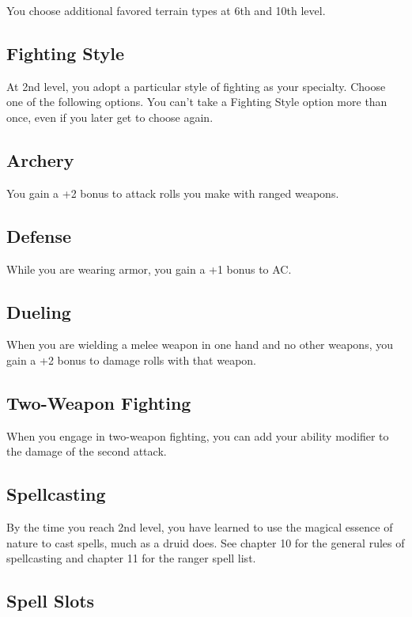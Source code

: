 You choose additional favored terrain types at 6th and 10th level.

\subsection{Fighting Style}

At 2nd level, you adopt a particular style of fighting as your specialty. Choose one of the following options. You can’t take a Fighting Style option more than once, even if you later get to choose again.

\subsection{Archery}

You gain a +2 bonus to attack rolls you make with ranged weapons.

\subsection{Defense}

While you are wearing armor, you gain a +1 bonus to AC.

\subsection{Dueling}

When you are wielding a melee weapon in one hand and no other weapons, you gain a +2 bonus to damage rolls with that weapon.

\subsection{Two-Weapon Fighting}

When you engage in two-weapon fighting, you can add your ability modifier to the damage of the second attack.

\subsection{Spellcasting}

By the time you reach 2nd level, you have learned to use the magical essence of nature to cast spells, much as a druid does. See chapter 10 for the general rules of spellcasting and chapter 11 for the ranger spell list.

\subsection{Spell Slots}

